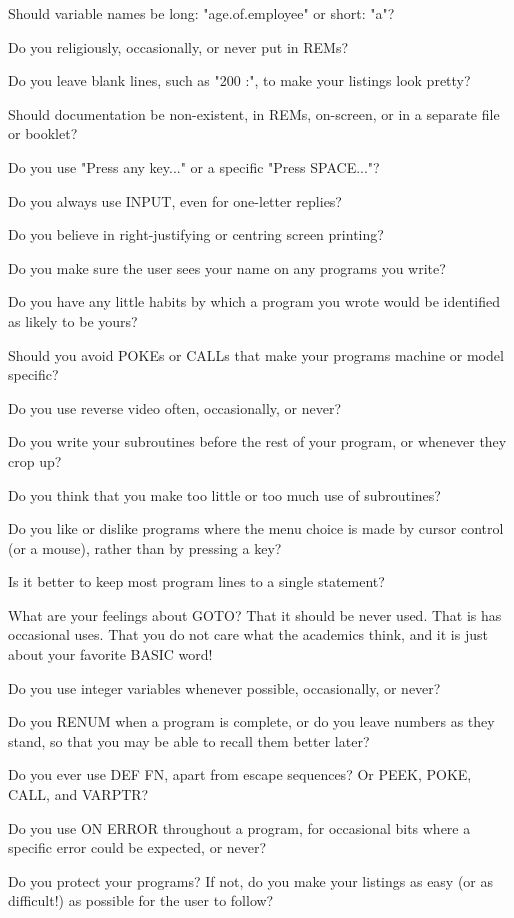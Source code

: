 \documentclass[]{report} %
\begin{document}
Should variable names be long: "age.of.employee" or short: "a"?

Do you religiously, occasionally, or never put in REMs?

Do you leave blank lines, such as "200 :", to make your listings look pretty?

Should  documentation  be non-existent, in REMs, on-screen, or in  a  separate 
file or booklet?

Do you use "Press any key..." or a specific "Press SPACE..."?

Do you always use INPUT, even for one-letter replies?

Do you believe in right-justifying or centring screen printing?

Do you make sure the user sees your name on any programs you write?

Do you have any little habits by which a program you wrote would be identified 
as likely to be yours?

Should  you  avoid  POKEs or CALLs that make your programs  machine  or  model 
specific?

Do you use reverse video often, occasionally, or never?

Do  you  write your subroutines before the rest of your program,  or  whenever 
they crop up?

Do you think that you make too little or too much use of subroutines?

Do  you  like  or dislike programs where the menu choice  is  made  by  cursor 
control (or a mouse), rather than by pressing a key?

Is it better to keep most program lines to a single statement?

What  are your feelings about GOTO? That it should be never used. That is  has 
occasional uses. That you do not care what the academics think, and it is just 
about your favorite BASIC word!

Do you use integer variables whenever possible, occasionally, or never?

Do  you  RENUM  when a program is complete, or do you leave  numbers  as  they 
stand, so that you may be able to recall them better later?

Do you ever use DEF FN, apart from escape sequences? Or PEEK, POKE, CALL,  and 
VARPTR?

Do you use ON ERROR throughout a program, for occasional bits where a specific 
error could be expected, or never?

Do you protect your programs? If not, do you make your listings as easy (or as 
difficult!) as possible for the user to follow?
\end{document}

